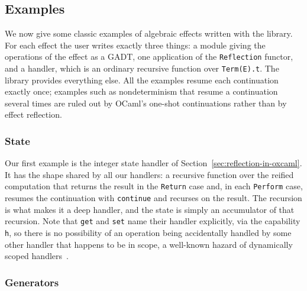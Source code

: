 \documentclass[acmsmall, screen, review, anonymous]{acmart}
\theoremstyle{definition}
\begin{document}
\subsection{Examples}
\label{sec:examples}

We now give some classic examples of algebraic effects written with
the library. For each effect the user writes exactly three things: a
module giving the operations of the effect as a GADT, one application
of the \lstinline[style=oxcaml]{Reflection} functor, and a handler,
which is an ordinary recursive function over
\lstinline[style=oxcaml]{Term(E).t}. The library provides everything
else. All the examples resume each continuation exactly once;
examples such as nondeterminism that resume a continuation several
times are ruled out by OCaml's one-shot continuations rather than by
effect reflection.

\subsubsection{State}

Our first example is the integer state handler of
Section~\ref{sec:reflection-in-oxcaml}. It has the shape shared by all
our handlers: a recursive function over the reified computation that
returns the result in the \lstinline[style=oxcaml]{Return} case and,
in each \lstinline[style=oxcaml]{Perform} case, resumes the
continuation with \lstinline[style=oxcaml]{continue} and recurses on
the result. The recursion is what makes it a deep handler, and the
state is simply an accumulator of that recursion. Note that
\lstinline[style=oxcaml]{get} and \lstinline[style=oxcaml]{set} name
their handler explicitly, via the capability
\lstinline[style=oxcaml]{h}, so there is no possibility of an
operation being accidentally handled by some other handler that
happens to be in scope, a well-known hazard of dynamically scoped
handlers~\cite{zhang2019abstraction}.

\subsubsection{Generators}
\end{document}
